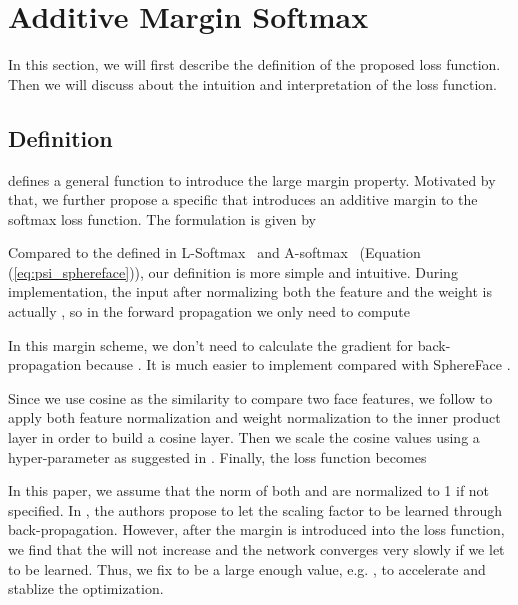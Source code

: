\documentclass[10pt,twocolumn,letterpaper]{article}
\begin{document}
\section{Additive Margin Softmax}

In this section, we will first describe the definition of the proposed loss function. Then we will discuss about the intuition and interpretation of the loss function.

\subsection{Definition}

\cite{liu2016large} defines a general function  to introduce the large margin property. Motivated by that, we further propose a specific  that introduces an additive margin to the softmax loss function. The formulation is given by

Compared to the  defined in L-Softmax~\cite{liu2016large} and A-softmax~\cite{liu2017sphereface} (Equation (\ref{eq:psi_sphereface})), our definition is more simple and intuitive. During implementation, the input after normalizing both the feature and the weight is actually , so in the forward propagation we only need to compute

In this margin scheme, we don't need to calculate the gradient for back-propagation because . It is much easier to implement compared with SphereFace \cite{liu2017sphereface}.

Since we use cosine as the similarity to compare two face features, we follow \cite{wang2017normface,liu2017spherenet,liu_2017_coco_v2} to apply both feature normalization and weight normalization to the inner product layer in order to build a cosine layer. Then we scale the cosine values using a hyper-parameter  as suggested in \cite{wang2017normface,liu2017spherenet,liu_2017_coco_v2}. Finally, the loss function becomes

In this paper, we assume that the norm of both  and  are normalized to 1 if not specified. In \cite{wang2017normface}, the authors propose to let the scaling factor  to be learned through back-propagation. However, after the margin is introduced into the loss function, we find that the  will not increase and the network converges very slowly if we let  to be learned. Thus, we fix  to be a large enough value, e.g. , to accelerate and stablize the optimization. 
\end{document}
